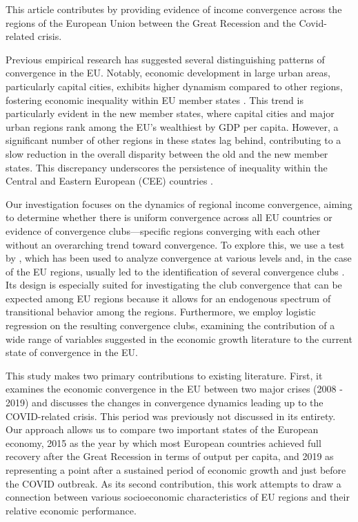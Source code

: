 \documentclass[11pt]{article}
\begin{document}
This article contributes by providing evidence of income convergence across the regions of the European Union between the Great Recession and the Covid-related crisis.

Previous empirical research has suggested several distinguishing patterns of convergence in the EU.  Notably, economic development in large urban areas, particularly capital cities, exhibits higher dynamism compared to other regions, fostering economic inequality within EU member states \citep{geppert2008regional}. This trend is particularly evident in the new member states, where capital cities and major urban regions rank among the EU's wealthiest by GDP per capita. However, a significant number of other regions in these states lag behind, contributing to a slow reduction in the overall disparity between the old and the new member states. This discrepancy underscores the persistence of inequality within the Central and Eastern European (CEE) countries \citep{geppert2008regional,sme2012regional, smketkowski2013regional}.

Our investigation focuses on the dynamics of regional income convergence, aiming to determine whether there is uniform convergence across all EU countries or evidence of convergence clubs—specific regions converging with each other without an overarching trend toward convergence. To explore this, we use a test by \citet{phillips2007transition}, which has been used to analyze convergence at various levels and, in the case of the EU regions, usually led to the identification of several convergence clubs \citep{bartkowska2012regional, borsi2015evolution, von2017regional}. Its design is especially suited for investigating the club convergence that can be expected among EU regions because it allows for an endogenous spectrum of transitional behavior among the regions. Furthermore, we employ logistic regression on the resulting convergence clubs, examining the contribution of a wide range of variables suggested in the economic growth literature to the current state of convergence in the EU.

This study makes two primary contributions to existing literature. First, it examines the economic convergence in the EU between two major crises (2008 - 2019) and discusses the changes in convergence dynamics leading up to the COVID-related crisis. This period was previously not discussed in its entirety. Our approach allows us to compare two important states of the European economy, 2015 as the year by which most European countries achieved full recovery after the Great Recession in terms of output per capita, and 2019 as representing a point after a sustained period of economic growth and just before the COVID outbreak. As its second contribution, this work attempts to draw a connection between various socioeconomic characteristics of EU regions and their relative economic performance.
\end{document}

